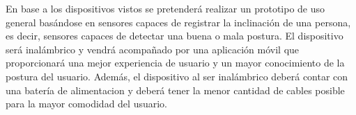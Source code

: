 En base a los dispositivos vistos se pretenderá realizar un prototipo de uso general basándose en sensores capaces de registrar la inclinación de una persona, es decir, sensores capaces de detectar una buena o mala postura. El dispositivo será inalámbrico y vendrá acompañado por una aplicación móvil que proporcionará una mejor experiencia de usuario y un mayor conocimiento de la postura del usuario. Además, el dispositivo al ser inalámbrico deberá contar con una batería de alimentacion y deberá tener la menor cantidad de cables posible para la mayor comodidad del usuario.
